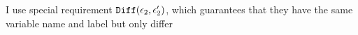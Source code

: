 I use special requirement $\mathtt{Diff}(\mathtt{\epsilon}_2, \mathtt{\epsilon}_2')$, which guarantees that they
have the same variable name and label but only differ 
